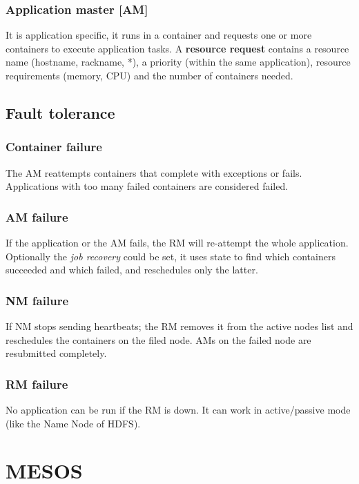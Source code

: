 		\subsubsection{Application master [AM]}
		It is application specific, it runs in a container and requests one or more containers to execute application tasks.\newline
		A \textbf{resource request} contains a resource name (hostname, rackname, *), a priority (within the same application), resource requirements (memory, CPU) and the number of containers needed.
	\subsection{Fault tolerance}
		\subsubsection{Container failure}
		The AM reattempts containers that complete with exceptions or fails. Applications with too many failed containers are considered failed.
		\subsubsection{AM failure}
		If the application or the AM fails, the RM will re-attempt the whole application. Optionally the \textit{job recovery} could be set, it uses state to find which containers succeeded and which failed, and reschedules only the latter.
		\subsubsection{NM failure}
		If NM stops sending heartbeats; the RM removes it from the active nodes list and reschedules the containers on the filed node. AMs on the failed node are resubmitted completely.
		\subsubsection{RM failure}
		No application can be run if the RM is down. It can work in active/passive mode (like the Name Node of HDFS).
	
\section{MESOS}
